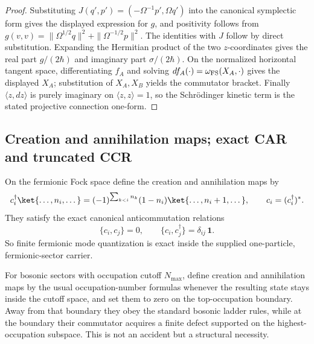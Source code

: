 \documentclass[12pt,a4paper]{article}
\begin{document}
\begin{proof}
Substituting \(J(q',p')=(-\Omega^{-1}p',\Omega q')\) into the canonical
symplectic form gives the displayed expression for \(g\), and positivity
follows from
\(g(v,v)=\|\Omega^{1/2}q\|^2+\|\Omega^{-1/2}p\|^2\).
The identities with \(J\) follow by direct substitution.  Expanding the
Hermitian product of the two \(z\)-coordinates gives the real part \(g/(2\hbar)\)
and imaginary part \(\sigma/(2\hbar)\).  On the normalized horizontal tangent
space, differentiating \(f_A\) and solving
\(df_A(\cdot)=\omega_{\rm FS}(X_A,\cdot)\) gives the displayed \(X_A\);
substitution of \(X_A,X_B\) yields the commutator bracket.  Finally
\(\langle z,dz\rangle\) is purely imaginary on \(\langle z,z\rangle=1\), so
the Schrödinger kinetic term is the stated projective connection one-form.
\end{proof}



\subsection{Creation and annihilation maps; exact CAR and truncated CCR}
\label{p4:sec:part2-car-ccr}

On the fermionic Fock space define the creation and annihilation maps by
\begin{equation}
\label{p4:eq:fermion-ladder}
c_i^\dagger\ket{\dots,n_i,\dots}
=
(-1)^{\sum_{k<i} n_k}(1-n_i)\ket{\dots,n_i+1,\dots},
\qquad
c_i=(c_i^\dagger)^*.
\end{equation}
They satisfy the exact canonical anticommutation relations
\begin{equation}
\label{p4:eq:car}
\{c_i,c_j\}=0,
\qquad
\{c_i,c_j^\dagger\}=\delta_{ij}\,\mathbf 1.
\end{equation}
So finite fermionic mode quantization is exact inside the supplied
one-particle, fermionic-sector carrier.

For bosonic sectors with occupation cutoff $N_{\max}$, define creation and annihilation maps by the usual occupation-number formulas whenever the resulting state stays inside the cutoff space, and set them to zero on the top-occupation boundary.
Away from that boundary they obey the standard bosonic ladder rules, while at the boundary their commutator acquires a finite defect supported on the highest-occupation subspace.
This is not an accident but a structural necessity.
\end{document}

